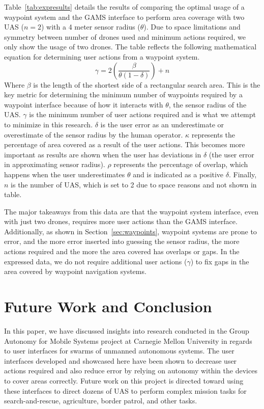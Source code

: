\documentclass{sig-alternate-ipsn13}
\begin{document}
Table~\ref{tab:expresults} details the results of comparing the optimal usage of
a waypoint system and the GAMS interface to perform area coverage with
two UAS ($n=2$) with a 4 meter sensor radius ($\theta$). Due to space limitations and
symmetry between number of drones used and minimum actions required, we
only show the usage of two drones. The table reflects the following
mathematical equation for determining user actions from a waypoint system.
%
\[
\gamma = 2 \left (\frac {\beta} {\theta (1 - \delta)} \right) + n
\]
%
Where $\beta$ is the length of the shortest side of a rectangular search area.
This is the key metric for determining the minimum number of waypoints required
by a waypoint interface
because of how it interacts with $\theta$, the sensor radius of the UAS. $\gamma$ is
the minimum number of user actions required and is what we attempt to minimize in this
research. $\delta$ is
the user error as an underestimate or overestimate of the sensor radius by the
human operator. $\kappa$ represents the percentage of area covered as a result
of the user actions. This becomes more important as results are shown when the
user has deviations in $\delta$ (the user error in approximating sensor radius).
$\rho$ represents the percentage of overlap, which happens when the user
underestimates $\theta$ and is indicated as a positive $\delta$.
Finally,
$n$ is the number of UAS, which is set to 2 due to space reasons and not shown in table.

The major takeaways from this data are that the waypoint system interface, even
with just two drones, requires more user actions than the GAMS interface.
Additionally, as shown in Section~\ref{sec:waypoints}, waypoint systems are prone to
error, and the more error inserted into guessing the sensor radius, the more actions
required and the more the area covered has overlaps or gaps. In the expressed data,
we do not require additional user actions ($\gamma$) to fix gaps in the area covered
by waypoint navigation systems.


\section{Future Work and Conclusion}
\label{sec:conc}

In this paper, we have discussed insights into research conducted in the Group
Autonomy for Mobile Systems project at Carnegie Mellon University in regards
to user interfaces for swarms of unmanned autonomous systems. The user
interfaces developed and showcased here have been shown to decrease
user actions required and also reduce error by relying on autonomy within
the devices to cover areas correctly. Future work on this project is directed toward
using these interfaces to direct dozens of UAS to perform complex mission tasks
for search-and-rescue, agriculture, border patrol, and other tasks.
\end{document}
